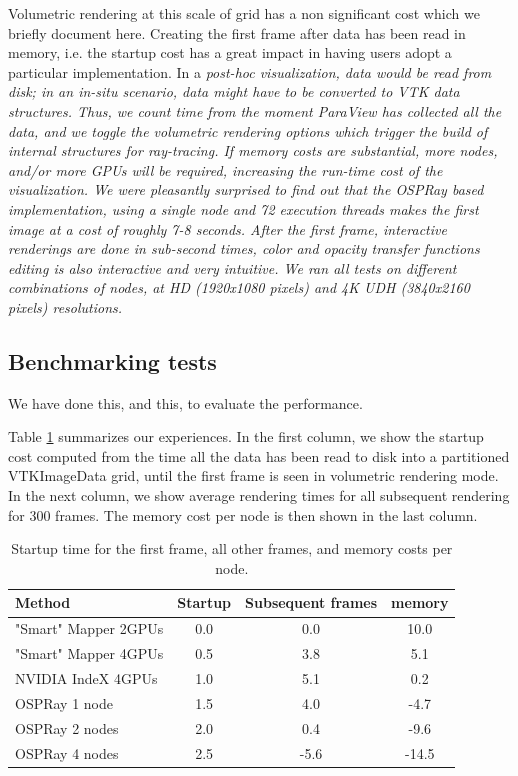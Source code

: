 \documentclass[final,5p,times,twocolumn]{elsarticle}
\begin{document}
Volumetric rendering at this scale of grid has a non significant cost which we
briefly document here. Creating the first frame after data has been read in memory,
 i.e. the startup cost has a great impact in having users adopt a particular implementation.
In a \it{post-hoc} \rm visualization, data would be read from disk; in an \it{in-situ} \rm
scenario, data might have to be converted to VTK data structures. Thus, we count time
from the moment ParaView has collected all the data, and we toggle the volumetric
rendering options which trigger the build of internal structures for ray-tracing.
If memory costs are substantial, more nodes, and/or more GPUs will be required, increasing the
run-time cost of the visualization. We were
pleasantly surprised to find out that the OSPRay based implementation, using a
single node and 72 execution threads makes the first image at a cost of roughly 7-8 seconds. 
After the first frame, interactive renderings are done in sub-second times,
color and opacity transfer functions editing is also interactive and very intuitive.
 We ran all tests on different combinations of nodes, at HD (1920x1080 pixels) and
4K UDH (3840x2160 pixels) resolutions.

\subsection{Benchmarking tests}

We have done this, and this, to evaluate the performance.



Table \ref{tab:example-tab} summarizes our experiences. In the first column, we
show the startup cost computed from the time all the data has been read to disk
into a partitioned VTKImageData grid, until the first frame is seen in volumetric
rendering mode. In the next column, we show average rendering times for all subsequent
rendering for 300 frames. The memory cost per node is then shown in the last column.

\begin{table}[htb]
  \centering
  \caption{
    Startup time for the first frame, all other frames, and memory costs per node.
  }
  \label{tab:example-tab}

  \begin{tabular}{lccc}
    \hline
    Method & Startup & Subsequent frames & memory \\
    \hline
    "Smart" Mapper 2GPUs & 0.0 &  0.0 &  10.0 \\
    "Smart" Mapper 4GPUs & 0.5 &  3.8 &  5.1 \\
    NVIDIA IndeX 4GPUs & 1.0 &  5.1 & 0.2 \\
    OSPRay 1 node & 1.5 &  4.0 &  -4.7 \\
    OSPRay 2 nodes & 2.0 &  0.4 &  -9.6 \\
    OSPRay 4 nodes & 2.5 & -5.6 & -14.5 \\
    \hline

  \end{tabular}
\end{table}
\end{document}
